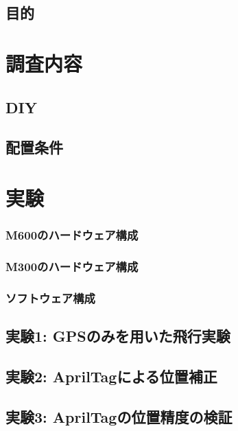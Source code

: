 \documentclass[a4j,fleqn,dvipdfmx,uplatex]{jsarticle}
\begin{document}
\subsection{目的}\label{purpose}


\section{調査内容}\label{sec2}

\subsection{DIY}\label{subsec:apriltag}

\subsection{配置条件}\label{subsec:tag_pos}



\section{実験}\label{sec3}

\subsubsection{M600のハードウェア構成}\label{subsubsec:m600}


\subsubsection{M300のハードウェア構成} 


\subsubsection{ソフトウェア構成}


\subsection{実験1: GPSのみを用いた飛行実験}\label{subsec:ex1}

\subsection{実験2: AprilTagによる位置補正}\label{subsec:ex2}

\subsection{実験3: AprilTagの位置精度の検証}\label{subsec:ex3}
\end{document}
